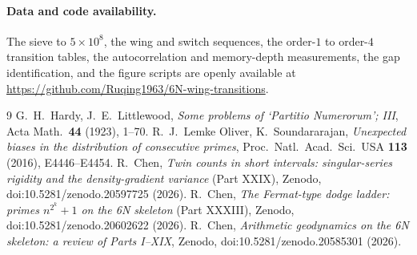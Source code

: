 \documentclass[11pt]{article}
\theoremstyle{definition}
\begin{document}
\paragraph{Data and code availability.} The sieve to $5\times10^{8}$, the wing and switch sequences, the
order-$1$ to order-$4$ transition tables, the autocorrelation and memory-depth measurements, the
gap identification, and the figure scripts are openly available at
\url{https://github.com/Ruqing1963/6N-wing-transitions}.

\begin{thebibliography}{9}
 G.~H.~Hardy, J.~E.~Littlewood, \emph{Some problems of `Partitio Numerorum'; III}, Acta Math.\ \textbf{44} (1923), 1--70.
 R.~J.~Lemke Oliver, K.~Soundararajan, \emph{Unexpected biases in the distribution of consecutive primes}, Proc.\ Natl.\ Acad.\ Sci.\ USA \textbf{113} (2016), E4446--E4454.
 R.~Chen, \emph{Twin counts in short intervals: singular-series rigidity and the density-gradient variance} (Part XXIX), Zenodo, doi:10.5281/zenodo.20597725 (2026).
 R.~Chen, \emph{The Fermat-type dodge ladder: primes $n^{2^k}+1$ on the 6N skeleton} (Part XXXIII), Zenodo, doi:10.5281/zenodo.20602622 (2026).
 R.~Chen, \emph{Arithmetic geodynamics on the 6N skeleton: a review of Parts I--XIX}, Zenodo, doi:10.5281/zenodo.20585301 (2026).
\end{thebibliography}
\end{document}
